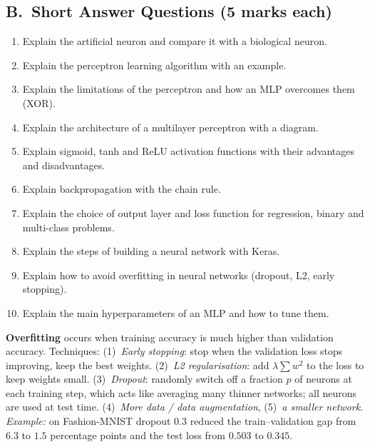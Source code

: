 \subsection*{B.\ Short Answer Questions (5 marks each)}
\begin{enumerate}
  \item Explain the artificial neuron and compare it with a biological neuron. 
  \item Explain the perceptron learning algorithm with an example. 
  \item Explain the limitations of the perceptron and how an MLP overcomes them (XOR). 
  \item Explain the architecture of a multilayer perceptron with a diagram. 
  \item Explain sigmoid, tanh and ReLU activation functions with their advantages and disadvantages. 
  \item Explain backpropagation with the chain rule. 
  \item Explain the choice of output layer and loss function for regression, binary and multi-class problems. 
  \item Explain the steps of building a neural network with Keras. 
  \item Explain how to avoid overfitting in neural networks (dropout, L2, early stopping). 
  \item Explain the main hyperparameters of an MLP and how to tune them. 
\end{enumerate}

\begin{modelans}
\textbf{Overfitting} occurs when training accuracy is much higher than validation accuracy. Techniques: (1)~\emph{Early stopping}: stop when the validation loss stops improving, keep the best weights. (2)~\emph{L2 regularisation}: add $\lambda\sum w^2$ to the loss to keep weights small. (3)~\emph{Dropout}: randomly switch off a fraction $p$ of neurons at each training step, which acts like averaging many thinner networks; all neurons are used at test time. (4)~\emph{More data / data augmentation}, (5)~\emph{a smaller network}. \emph{Example:} on Fashion-MNIST dropout $0.3$ reduced the train--validation gap from $6.3$ to $1.5$ percentage points and the test loss from $0.503$ to $0.345$.
\end{modelans}

